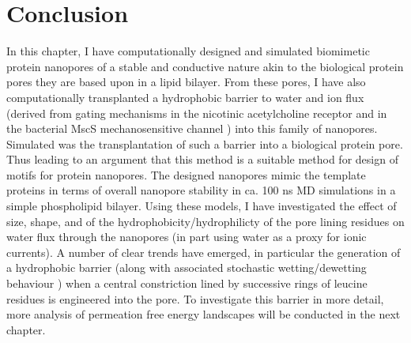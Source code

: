 \newpage

\section{Conclusion}


In this chapter, I have computationally designed and simulated biomimetic protein nanopores of a stable and conductive nature akin to the biological protein pores they are based upon in a lipid bilayer. From these pores, I have also computationally transplanted a hydrophobic barrier to water and ion flux (derived from gating mechanisms in the nicotinic acetylcholine receptor and in the bacterial MscS mechanosensitive channel \cite{Beckstein2006b,Anishkin2004}) into this family of nanopores. Simulated was the transplantation of such a barrier into a biological protein pore. Thus leading to an argument that this method is a suitable method for design of motifs for protein nanopores. The designed nanopores mimic the template proteins in terms of overall nanopore stability in ca. 100 ns MD simulations in a simple phospholipid bilayer. Using these models, I have investigated the effect of size, shape, and of the hydrophobicity/hydrophilicty of the pore lining residues on water flux through the nanopores (in part using water as a proxy for ionic currents). A number of clear trends have emerged, in particular the generation of a hydrophobic barrier (along with associated stochastic wetting/dewetting behaviour \cite{Vaitheeswaran2004f,Dzubiella2004d}) when a central constriction lined by successive rings of leucine residues is engineered into the pore. To investigate this barrier in more detail, more analysis of permeation free energy landscapes will be conducted in the next chapter.

